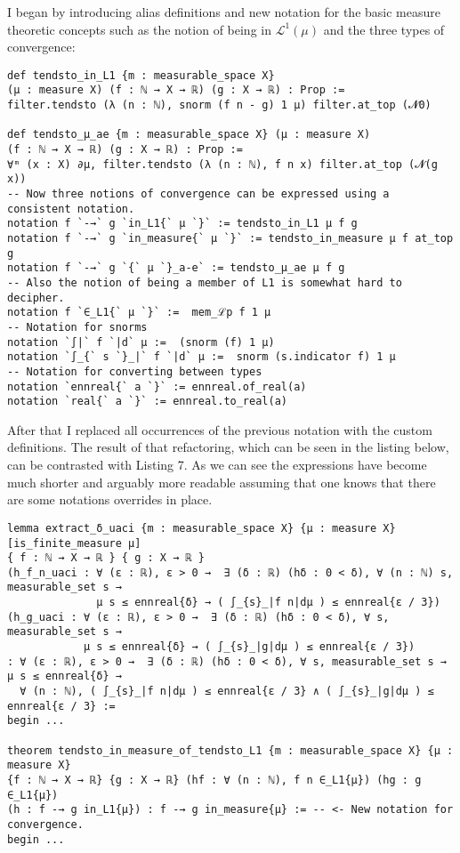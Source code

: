 \documentclass[11pt]{article}
\newenvironment{code}{\captionsetup{type=listing}}{}
\newcommand\Lmu{\mathcal{L}^1(\mu)}
\begin{document}
I began by introducing alias definitions and new notation for the basic measure theoretic concepts such
as the notion of being in $\Lmu$ and the three types of convergence:
\begin{code}
\begin{verbatim}
def tendsto_in_L1 {m : measurable_space X}
(μ : measure X) (f : ℕ → X → ℝ) (g : X → ℝ) : Prop :=
filter.tendsto (λ (n : ℕ), snorm (f n - g) 1 μ) filter.at_top (𝓝0)

def tendsto_μ_ae {m : measurable_space X} (μ : measure X)
(f : ℕ → X → ℝ) (g : X → ℝ) : Prop :=
∀ᵐ (x : X) ∂μ, filter.tendsto (λ (n : ℕ), f n x) filter.at_top (𝓝(g x))
-- Now three notions of convergence can be expressed using a consistent notation.
notation f `-→` g `in_L1{` μ `}` := tendsto_in_L1 μ f g
notation f `-→` g `in_measure{` μ `}` := tendsto_in_measure μ f at_top g
notation f `-→` g `{` μ `}_a-e` := tendsto_μ_ae μ f g
-- Also the notion of being a member of L1 is somewhat hard to decipher.
notation f `∈_L1{` μ `}` :=  mem_ℒp f 1 μ
-- Notation for snorms
notation `∫|` f `|d` μ :=  (snorm (f) 1 μ)
notation `∫_{` s `}_|` f `|d` μ :=  snorm (s.indicator f) 1 μ
-- Notation for converting between types
notation `ennreal{` a `}` := ennreal.of_real(a)
notation `real{` a `}` := ennreal.to_real(a)
\end{verbatim}
\end{code}

After that I replaced all occurrences of the previous notation with the custom
definitions. The result of that refactoring, which can be seen in the listing below,
can be contrasted with Listing 7. As we can see the expressions have become much
shorter and arguably more readable assuming that one knows that there are some
notations overrides in place.
\begin{code}
\begin{verbatim}
lemma extract_δ_uaci {m : measurable_space X} {μ : measure X} [is_finite_measure μ]
{ f : ℕ → X → ℝ } { g : X → ℝ }
(h_f_n_uaci : ∀ (ε : ℝ), ε > 0 →  ∃ (δ : ℝ) (hδ : 0 < δ), ∀ (n : ℕ) s, measurable_set s →
              μ s ≤ ennreal{δ} → ( ∫_{s}_|f n|dμ ) ≤ ennreal{ε / 3})
(h_g_uaci : ∀ (ε : ℝ), ε > 0 →  ∃ (δ : ℝ) (hδ : 0 < δ), ∀ s, measurable_set s →
            μ s ≤ ennreal{δ} → ( ∫_{s}_|g|dμ ) ≤ ennreal{ε / 3})
: ∀ (ε : ℝ), ε > 0 →  ∃ (δ : ℝ) (hδ : 0 < δ), ∀ s, measurable_set s → μ s ≤ ennreal{δ} →
  ∀ (n : ℕ), ( ∫_{s}_|f n|dμ ) ≤ ennreal{ε / 3} ∧ ( ∫_{s}_|g|dμ ) ≤ ennreal{ε / 3} :=
begin ...

theorem tendsto_in_measure_of_tendsto_L1 {m : measurable_space X} {μ : measure X}
{f : ℕ → X → ℝ} {g : X → ℝ} (hf : ∀ (n : ℕ), f n ∈_L1{μ}) (hg : g ∈_L1{μ})
(h : f -→ g in_L1{μ}) : f -→ g in_measure{μ} := -- <- New notation for convergence.
begin ...
\end{verbatim}
\end{code}
\end{document}
